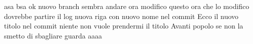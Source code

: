 \documentclass{article}
\begin{document}
asa
bsa
ok nuovo branch
sembra andare
ora modifico questo
ora che lo modifico dovrebbe partire il log
nuova riga con nuovo nome nel commit
Ecco il nuovo titolo nel commit
niente non vuole prendermi il titolo
Avanti popolo
se non la smetto di sbagliare guarda
aaaa
\end{document}
